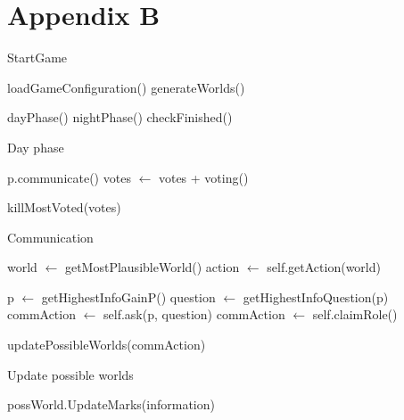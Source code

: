 \section{Appendix B}\label{app:B}
\begin{algorithm}
	\caption{StartGame}
	\begin{algorithmic}[1]
		\State loadGameConfiguration()
		\State generateWorlds()

		\State dayPhase()
		\State nightPhase()
		\State checkFinished()
		\EndWhile
		\EndFunction
	\end{algorithmic}
\end{algorithm}

\begin{algorithm}
	\caption{Day phase}
	\begin{algorithmic}[1]
		\State p.communicate()
		\EndFor
		\State votes $\gets$ votes + voting()
		\EndFor

		\State killMostVoted(votes)
		\EndFunction
	\end{algorithmic}
\end{algorithm}

\begin{algorithm}
	\caption{Communication}
	\begin{algorithmic}[1]
		\State world $\gets$ getMostPlausibleWorld()
		\State action $\gets$ self.getAction(world)

		\State p $\gets$ getHighestInfoGainP()
		\State question $\gets$ getHighestInfoQuestion(p)
		\State commAction $\gets$ self.ask(p, question)
		\State commAction $\gets$ self.claimRole()
		\EndIf

		\State updatePossibleWorlds(commAction)
		\EndFunction
	\end{algorithmic}
\end{algorithm}

\begin{algorithm}
	\caption{Update possible worlds}
	\begin{algorithmic}[1]
		\State possWorld.UpdateMarks(information)
		\EndFor
		\EndFor
		\EndFunction
	\end{algorithmic}
\end{algorithm}

